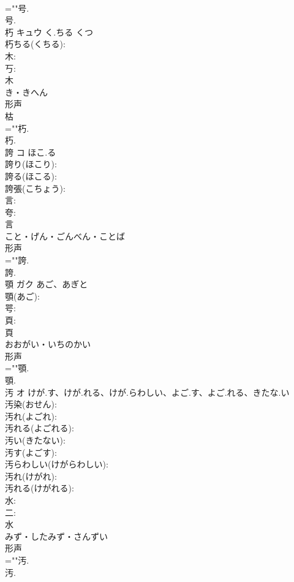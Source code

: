 \documentclass[8pt]{extreport}
\begin{document}
\begin{CJK}{UTF8}{min}
\\	=""号.
\\	号.
\\	朽	キュウ	く.ちる	くつ	
\\	朽ちる(くちる): 
\\	木: 
\\	丂: 
\\	木	
\\	き・きへん	
\\	形声 
\\	枯 
\\	=""朽.
\\	朽.
\\	誇	コ	ほこ.る		
\\	誇り(ほこり): 
\\	誇る(ほこる): 
\\	誇張(こちょう): 
\\	言: 
\\	夸: 
\\	言	
\\	こと・げん・ごんべん・ことば	
\\	形声 
\\	=""誇.
\\	誇.
\\	顎	ガク	あご、あぎと		
\\	顎(あご): 
\\	咢: 
\\	頁: 
\\	頁	
\\	おおがい・いちのかい	
\\	形声 
\\	=""顎.
\\	顎.
\\	汚	オ	けが.す、けが.れる、けが.らわしい、よご.す、よご.れる、きたな.い		
\\	汚染(おせん): 
\\	汚れ(よごれ): 
\\	汚れる(よごれる): 
\\	汚い(きたない): 
\\	汚す(よごす): 
\\	汚らわしい(けがらわしい): 
\\	汚れ(けがれ): 
\\	汚れる(けがれる): 
\\	水: 
\\	二: 
\\	水	
\\	みず・したみず・さんずい	
\\	形声 
\\	=""汚.
\\	汚.

\end{CJK}
\end{document}
